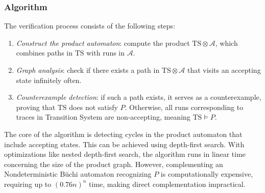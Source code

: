 \subsubsection{Algorithm}
The verification process consists of the following steps:
\begin{enumerate}
    \item \textit{Construct the product automaton}: compute the product $\text{TS} \otimes \mathcal{A}$, which combines paths in $\text{TS}$ with runs in $\mathcal{A}$.
    \item \textit{Graph analysis}: check if there exists a path in $\text{TS} \otimes \mathcal{A}$ that visits an accepting state infinitely often.
    \item \textit{Counterexample detection}: if such a path exists, it serves as a counterexample, proving that $\text{TS}$ does not satisfy $P$.
        Otherwise, all runs corresponding to traces in Transition System are non-accepting, meaning $\text{TS}\models P$.
\end{enumerate}
\noindent The core of the algorithm is detecting cycles in the product automaton that include accepting states. 
This can be achieved using depth-first search.
With optimizations like nested depth-first search, the algorithm runs in linear time concerning the size of the product graph.
However, complementing an Nondeterministic Büchi automaton recognizing $P$ is computationally expensive, requiring up to $(0.76n)^n$ time, making direct complementation impractical.